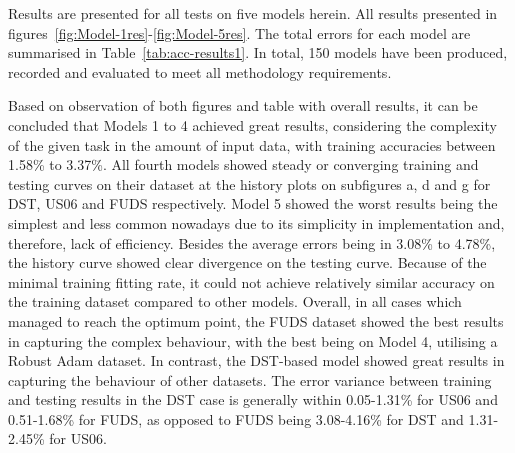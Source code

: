 
Results are presented for all tests on five models herein.
All results presented in figures~\ref{fig:Model-1res}-\ref{fig:Model-5res}.
The total errors for each model are summarised in Table~\ref{tab:acc-results1}.
In total, 150 models have been produced, recorded and evaluated to meet all methodology requirements.

Based on observation of both figures and table with overall results, it can be concluded that Models 1 to 4 achieved great results, considering the complexity of the given task in the amount of input data, with training accuracies between 1.58\% to 3.37\%.
All fourth models showed steady or converging training and testing curves on their dataset at the history plots on subfigures a, d and g for DST, US06 and FUDS respectively.
Model 5 showed the worst results being the simplest and less common nowadays due to its simplicity in implementation and, therefore, lack of efficiency.
Besides the average errors being in 3.08\% to 4.78\%, the history curve showed clear divergence on the testing curve. 
Because of the minimal training fitting rate, it could not achieve relatively similar accuracy on the training dataset compared to other models.
Overall, in all cases which managed to reach the optimum point, the FUDS dataset showed the best results in capturing the complex behaviour, with the best being on Model 4, utilising a Robust Adam dataset.
In contrast, the DST-based model showed great results in capturing the behaviour of other datasets.
The error variance between training and testing results in the DST case is generally within 0.05-1.31\% for US06 and 0.51-1.68\% for FUDS, as opposed to FUDS being 3.08-4.16\% for DST and 1.31-2.45\% for US06.

